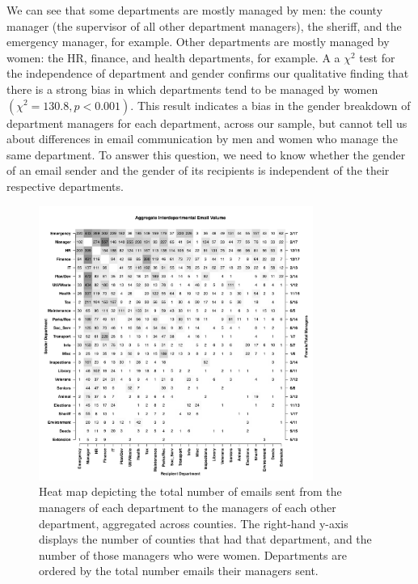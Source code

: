 \documentclass{pnastwo}
\begin{document}
\begin{article}
\begin{table}
	\end{table}
	\setlength{\tabcolsep}{6pt}
	
	
We can see that some departments are mostly managed by men: the county manager (the supervisor of all other department managers), the sheriff, and the emergency manager, for example. Other departments  are mostly managed by women: the HR, finance, and health departments, for example. A a $\chi^2$ test for the independence of department and gender confirms our qualitative finding that there is a strong bias in which departments tend to be managed by women $(\chi^2 = 130.8, p < 0.001)$. This result indicates a bias in the gender breakdown of department managers for each department, across our sample, but cannot tell us about differences in email communication by men and women who manage the same department. To answer this question, we need to know whether the gender of an email sender and the gender of its recipients is independent of the their respective departments. 
	
	\begin{figure}
	\centering
	\includegraphics[width = 0.8\textwidth]{images/Aggregate_Email_Flows.pdf}
	\caption{\label{fig:heatmaps}Heat map depicting the total number of emails sent from the managers of each department to the managers of each other department, aggregated across counties. The right-hand y-axis displays the number of counties that had that department, and the number of those managers who were women. Departments are ordered by the total number emails their managers sent.}
	\end{figure}
	

\end{article}
\end{document}

